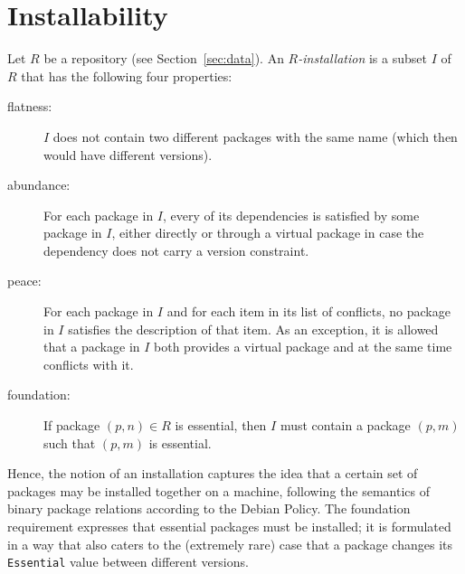 \section{Installability}
\label{sec:installability}

Let $R$ be a repository (see Section~\ref{sec:data}).  An
\emph{$R$-installation} is a subset $I$ of $R$ that has the following four
properties:
\begin{description}
  \item[flatness:] $I$ does not contain two different packages with the same
    name (which then would have different versions).
  \item[abundance:] For each package in $I$, every of its dependencies
    is satisfied by some package in $I$, either directly or through a
    virtual package in case the dependency does not carry a version
    constraint.
  \item[peace:] For each package in $I$ and for each item in its list
    of conflicts, no package in $I$ satisfies the description of that
    item.  As an exception, it is allowed that a package in $I$ both
    provides a virtual package and at the same time conflicts with it.
  \item[foundation:] If package $(p,n)\in R$ is essential, then $I$
    must contain a package $(p,m)$ such that $(p,m)$ is essential.
\end{description}
Hence, the notion of an installation captures the idea that a certain
set of packages may be installed together on a machine, following the
semantics of binary package relations according to the Debian Policy.
The foundation requirement expresses that essential packages must be
installed; it is formulated in a way that also caters to the
(extremely rare) case that a package changes its \texttt{Essential}
value between different versions.

